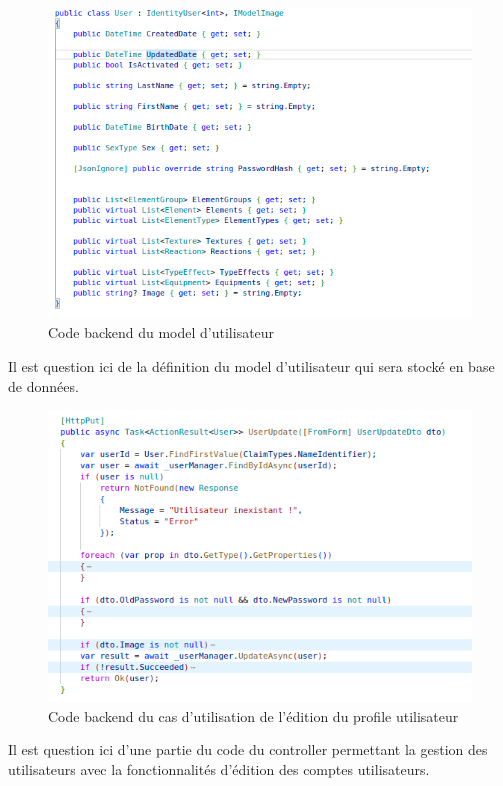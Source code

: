 \begin{figure}[H]
	\centering
	\includegraphics[width=1\textwidth]{img/codeuu}
	\caption{Code backend du model d'utilisateur}
	\label{fig:mesh1}
\end{figure}

Il est question ici de la définition du model d'utilisateur qui sera stocké en base de données.

\begin{figure}[H]
	\centering
	\includegraphics[width=1\textwidth]{img/codeuup}
	\caption{Code backend du cas d'utilisation de l'édition du profile utilisateur}
	\label{fig:mesh1}
\end{figure}

Il est question ici d'une partie du code du controller permettant la gestion des utilisateurs avec la fonctionnalités d'édition des comptes utilisateurs.

